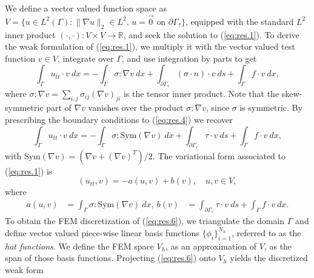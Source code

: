 We define a vector valued function space as $V = \{ u \in L^2(\Gamma) : \| \nabla u \|_2 \in L^2 \text{, } u = \vec 0 \text{ on } \partial \Gamma_\tau \}$, equipped with the standard $L^2$ inner product $(\cdot,\cdot):V\times V \to \mathbb R$, and seek the solution to (\ref{eq:res.1}). To derive the weak formulation of (\ref{eq:res.1}), we multiply it with the vector valued test function $v \in V$, integrate over $\Gamma$, and use integration by parts to get 
\begin{equation}  \label{eq:res.4}
	\int_{\Gamma} u_{tt} \cdot v\ dx = - \int_{\Gamma} \sigma : \nabla v \ dx+ \int_{\partial \Gamma_\tau} (\sigma \cdot n) \cdot v\ ds +  \int_{\Gamma} f \cdot v \ dx,
\end{equation}
where $\sigma : \nabla v = \sum_{i,j}\sigma_{ij}(\nabla v)_{ji}$ is the tensor inner product. Note that the skew-symmetric part of $\nabla v$ vanishes over the product $\sigma : \nabla v$, since $\sigma$ is symmetric. By prescribing the boundary conditions to (\ref{eq:res.4}) we recover
\begin{equation} \label{eq:res.5}
	\int_{\Gamma} u_{tt} \cdot v\ dx = - \int_{\Gamma} \sigma : \text{Sym}(\nabla v) \ dx+ \int_{\partial \Gamma_\tau} \tau \cdot v\ ds +  \int_{\Gamma} f \cdot v \ dx,
\end{equation}
with Sym$(\nabla v) = (\nabla v + (\nabla v)^T)/2$. The variational form associated to (\ref{eq:res.1}) is
\begin{equation} \label{eq:res.6}
	(u_{tt},v) = - a(u,v) + b(v), \quad u,v\in V,
\end{equation}
where
\begin{equation} \label{eq:res.7}
\begin{aligned}
	a(u,v) &= \int_{\Gamma} \sigma : \text{Sym}(\nabla v) \ dx, ~
	b(v) &= \int_{\partial \Gamma_\tau} \tau \cdot v\ ds +  \int_{\Gamma} f \cdot v \ dx.
\end{aligned}
\end{equation}
To obtain the FEM discretization of (\ref{eq:res.6}), we triangulate the domain $\Gamma$ and define vector valued piece-wise linear basis functions $\{\phi_i\}_{i=1}^{N_h}$, referred to as the \emph{hat functions}. We define the FEM space $V_h$, as an approximation of $V$, as the span of those basis functions. Projecting (\ref{eq:res.6}) onto $V_h$ yields the discretized weak form
